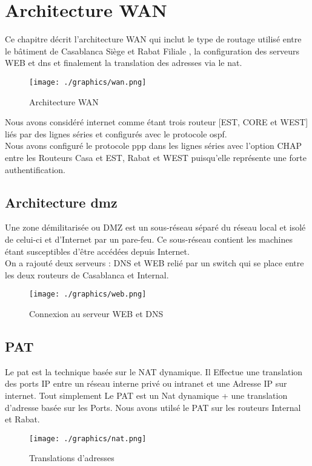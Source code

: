 \documentclass[12pt,a4paper]{report}
\begin{document}
		\chapter{Architecture WAN}
		Ce chapitre décrit l’architecture WAN qui inclut le type de routage utilisé entre le bâtiment de Casablanca \guillemotleft Siège \guillemotright et Rabat  \guillemotleft Filiale \guillemotright, la configuration des serveurs WEB et \ac{dns} et finalement la translation des adresses via le \ac{nat}.


		\begin{figure}[!hbtp]
			\centering
			\texttt{[image: ./graphics/wan.png]}
			\caption{Architecture WAN}
		\end{figure}

		Nous avons considéré internet comme étant trois routeur [EST, CORE et WEST] liés par des lignes séries et configurés avec le protocole \ac{ospf}.\\
		Nous avons configuré le protocole \ac{ppp} dans les lignes séries avec l’option CHAP entre les Routeurs Casa et EST, Rabat et WEST puisqu’elle représente une forte authentification.

		\section{Architecture \ac{dmz}}
		Une zone démilitarisée ou DMZ est un sous-réseau séparé du réseau local et isolé de celui-ci et d'Internet par un pare-feu. Ce sous-réseau contient les machines étant susceptibles d'être accédées depuis Internet.\\
		On a rajouté deux serveurs : DNS et WEB relié par un switch qui se place entre les deux routeurs de Casablanca et Internal.

		\begin{figure}[!hbtp]
			\centering
			\texttt{[image: ./graphics/web.png]}
			\caption{Connexion au serveur WEB et DNS}
		\end{figure}

		\section{PAT}
		Le \ac{pat} est la technique basée sur le NAT dynamique.  Il Effectue une translation des ports IP entre un réseau interne  privé ou intranet et une Adresse IP sur internet. Tout simplement Le PAT est un Nat dynamique + une translation d'adresse basée sur les Ports. Nous avons utilsé le PAT sur les routeurs Internal et Rabat.
		\begin{figure}[!hbtp]
			\centering
			\texttt{[image: ./graphics/nat.png]}
			\caption{Translations d'adresses}
		\end{figure}
\end{document}
